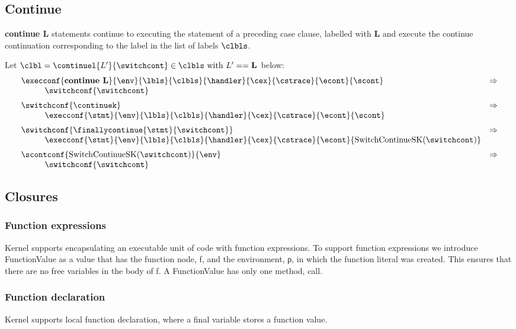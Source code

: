 \documentclass{article}
\begin{document}
\subsection{Continue}
\textbf{continue L} statements continue to executing the statement of a preceding case clause, labelled with \textbf{L} and execute the continue continuation corresponding to the label in the list of labels $\clbls$.

Let $\clbl = \continuel{L'}{\switchcont} \in \clbls \textrm{ with } L' == \mathbf{L}$ below:
\[
  \begin{array}{lcl}
	\execconf{\textbf{continue L}}{\env}{\lbls}{\clbls}{\handler}{\cex}{\cstrace}{\econt}{\scont}
	& \Rightarrow \\
	\hspace{10mm}\switchconf{\switchcont}\\[2mm]

	\switchconf{\continuek}
	& \Rightarrow \\
	\hspace{10mm}\execconf{\stmt}{\env}{\lbls}{\clbls}{\handler}{\cex}{\cstrace}{\econt}{\scont}\\[2mm]

	\switchconf{\finallycontinue{\stmt}{\switchcont}}
	& \Rightarrow \\
	\hspace{10mm}\execconf{\stmt}{\env}{\lbls}{\clbls}{\handler}{\cex}{\cstrace}{\econt}{\mathrm{SwitchContinueSK}(\switchcont)}\\[2mm]

	\scontconf{\mathrm{SwitchContinueSK}(\switchcont)}{\env}
	& \Rightarrow \\
	\hspace{10mm}\switchconf{\switchcont}
  \end{array}
\]
\subsection{Closures}
\subsubsection{Function expressions}

Kernel supports encapsulating an executable unit of code with function expressions. To support function expressions we introduce FunctionValue as a value that has the function node, f, and the environment, ρ,  in which the function literal was created. This ensures that there are no free variables in the body of f. A FunctionValue has only one method, call.
 
\subsubsection{Function declaration}
Kernel supports local function declaration, where a final variable stores a function value. 
\end{document}
